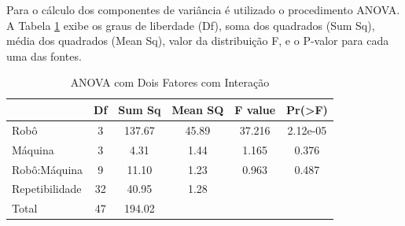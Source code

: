 \documentclass[
12pt,					%
openright,				%
oneside,				%
a4paper,				%
english,
brazil
]{ABNT/abntex2_report}
\begin{document}
Para o cálculo dos componentes de variância é utilizado o procedimento ANOVA. A Tabela \ref{tab:with_interaction} exibe os graus de liberdade (Df), soma dos quadrados (Sum Sq), média dos quadrados (Mean Sq), valor da distribuição F, e o P-valor para cada uma das fontes.
\begin{table}[H]
	\caption{ANOVA com Dois Fatores com Interação}
	\centering
	\begin{tabular}{lccccc}
										& \multicolumn{1}{l}{Df} & \multicolumn{1}{l}{Sum Sq} & \multicolumn{1}{l}{Mean SQ} & \multicolumn{1}{l}{F value} & \multicolumn{1}{l}{Pr(\textgreater{}F)} \\ \hline
	\multicolumn{1}{l|}{Robô}           & 3  & 137.67 & 45.89   & 37.216  & 2.12e-05            \\
	\multicolumn{1}{l|}{Máquina}        & 3  & 4.31   & 1.44    & 1.165   & 0.376               \\
	\multicolumn{1}{l|}{Robô:Máquina}   & 9  & 11.10  & 1.23    & 0.963   & 0.487               \\
	\multicolumn{1}{l|}{Repetibilidade} & 32 & 40.95  & 1.28    &         &                     \\
	\multicolumn{1}{l|}{Total}          & 47 & 194.02 &         &         &                    
	\end{tabular}
	\label{tab:with_interaction}
\end{table}
\end{document}
